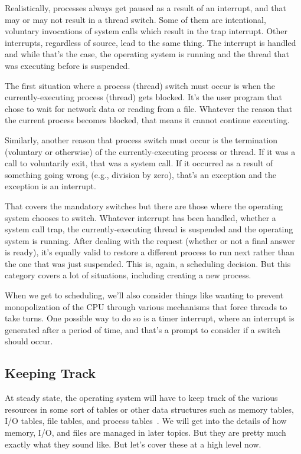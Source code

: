Realistically, processes always get paused as a result of an interrupt, and that may or may not result in a thread switch. Some of them are intentional, voluntary invocations of system calls which result in the trap interrupt. Other interrupts, regardless of source, lead to the same thing. The interrupt is handled and while that's the case, the operating system is running and the thread that was executing before is suspended. 

The first situation where a process (thread) switch must occur is when the currently-executing process (thread) gets blocked. It's the user program that chose to wait for network data or reading from a file. Whatever the reason that the current process becomes blocked, that means it cannot continue executing.

Similarly, another reason that process switch must occur is the termination (voluntary or otherwise) of the currently-executing process or thread. If it was a call to voluntarily exit, that was a system call. If it occurred as a result of something going wrong (e.g., division by zero), that's an exception and the exception is an interrupt.

That covers the mandatory switches but there are those where the operating system chooses to switch. Whatever interrupt has been handled, whether a system call trap, the currently-executing thread is suspended and the operating system is running. After dealing with the request (whether or not a final answer is ready), it's equally valid to restore a different process to run next rather than the one that was just suspended. This is, again, a scheduling decision. But this category covers a lot of situations, including creating a new process.

When we get to scheduling, we'll also consider things like wanting to prevent monopolization of the CPU through various mechanisms that force threads to take turns. One possible way to do so is a timer interrupt, where an interrupt is generated after a period of time, and that's a prompt to consider if a switch should occur.

\subsection*{Keeping Track}
At steady state, the operating system will have to keep track of the various resources in some sort of tables or other data structures such as memory tables, I/O tables, file tables, and process tables~\cite{osi}. We will get into the details of how memory, I/O, and files are managed in later topics. But they are pretty much exactly what they sound like.  But let's cover these at a high level now.

